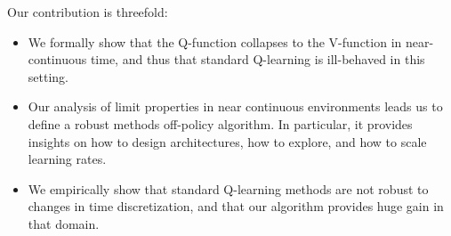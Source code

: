 Our contribution is threefold:
\begin{itemize} 
\item We formally show that the Q-function collapses to the V-function in near-continuous time, and thus that
    standard Q-learning is ill-behaved in this setting.
  \item Our analysis of limit properties in near continuous environments leads us to define a robust methods off-policy algorithm. In particular,
    it provides insights on how to design architectures, how to explore, and how to scale learning rates.
  \item We empirically show that standard Q-learning methods are not robust to changes in time discretization, and that our algorithm provides huge gain in that domain.
\end{itemize}


